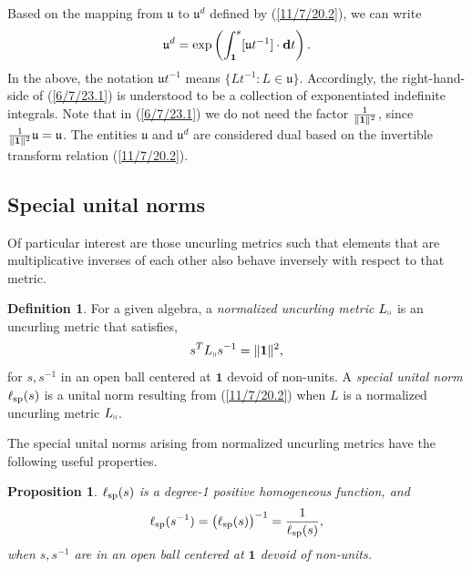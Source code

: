 \documentclass{amsart}
\newtheorem{proposition}[theorem]{Proposition}
\theoremstyle{definition}
\newtheorem{definition}[theorem]{Definition}
\numberwithin{theorem}{section}
\numberwithin{equation}{section}
\begin{document}
 Based on the mapping from $\mathfrak{u}$ to $\mathfrak{u}^d$ defined by (\ref{11/7/20.2}),  we can write \begin{equation}  \mathfrak{u}^d = \exp\left(\int_{\bf 1}^s [\mathfrak{u}t^{-1}]\cdot \mathbf{d}t\right). \label{6/7/23.1}\end{equation}  In the above, the notation $\mathfrak{u}t^{-1}$ means $\{Lt^{-1}: L\in \mathfrak{u}\}$.  Accordingly, the right-hand-side of (\ref{6/7/23.1}) is understood to be a collection of exponentiated indefinite integrals.   Note that in (\ref{6/7/23.1}) we do not need the factor $\frac{1}{\|{\bf 1}\|^2}$, since $\frac{1}{\|{\bf 1}\|^2}\mathfrak{u}=\mathfrak{u}$.  The entities  $\mathfrak{u}$ and $\mathfrak{u}^d$ are considered dual based on the invertible transform relation (\ref{11/7/20.2}).
  

\subsection{Special unital norms}
Of particular interest are those uncurling metrics such that elements that are multiplicative inverses of each other also behave inversely with respect to that metric.   
 
    \begin{definition}\label{9/20/23.1} For a given algebra, a {\it normalized uncurling metric} $L_{\shortparallel}$ is an uncurling metric that satisfies, \begin{equation} \label{7/7/21.1} s^TL_{\shortparallel} s^{-1} =\|{\bf 1}\|^2,\end{equation} for $s,s^{-1}$ in an open ball centered at $\mathbf{1}$ devoid of non-units.   A {\it special unital norm} $\ell_{\rm sp}(s)$ is a unital norm resulting from (\ref{11/7/20.2}) when $L$ is a normalized uncurling metric $L_{\shortparallel}$. 
\end{definition}

The special unital norms arising from normalized uncurling metrics have the following useful properties.
  
  \begin{proposition}\label{9/24/23.1} $ \ell_{\rm sp}(s)$ is a degree-1 positive homogeneous function, and
\begin{equation}\label{5/23/23.3}  \ell_{\rm sp}(s^{-1}) = \big(\ell_{\rm sp}(s)\big)^{-1} = \frac{1}{\ell_{\rm sp}(s)}, \end{equation} when $s,s^{-1}$ are in an open ball centered at $\mathbf{1}$ devoid of non-units. \end{proposition}
\end{document}
